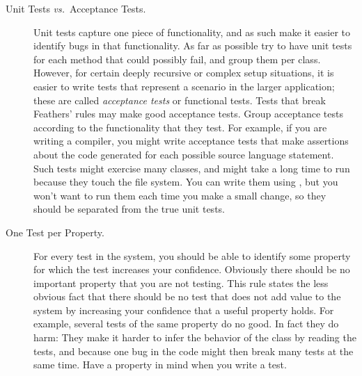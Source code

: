 \documentclass[a4paper,10pt,twoside]{book}
\begin{document}
{\begin{description}
\item[Unit Tests \textit{vs.}\ Acceptance Tests.]
	Unit tests capture one piece of functionality, and as such make it easier to identify bugs in that functionality.
	As far as possible try to have unit tests for each method that could possibly fail, and group them per class.
	However, for certain deeply recursive or complex setup situations, it is easier to write tests that represent a scenario in the larger application; these are called \emph{acceptance tests} or functional tests.
	Tests that break Feathers' rules may make good acceptance tests.
	Group acceptance tests according to the functionality that they test.
	For example, if you are writing a compiler, you might write acceptance tests that make  assertions about the code generated for each possible source language statement.
	Such tests might exercise many classes, and might take a long time to run because they touch the file system.
	You can write them using \sunit, but you won't want to run them each time you make a small change, so they should be separated from the true unit tests.

\item[One Test per Property.]
	For every test in the system, you should be able to identify some property for which the test increases your confidence.
	Obviously there should be no important property that you are not testing.
	This rule states the less obvious fact that there should be no test that does not add value to the system by increasing your confidence that a useful property holds.
	For example, several tests of the same property do no good.
	In fact they do harm:
	They make it harder to infer the behavior of the class by reading the tests, and because one bug in the code might then break many tests at the same time.
	Have a property in mind when you write a test.
\end{description}



}
\end{document}
